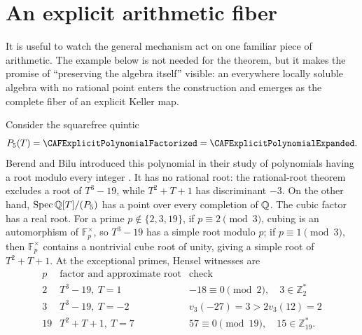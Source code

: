 \section{An explicit arithmetic fiber}\label{sec:example}



It is useful to watch the general mechanism act on one familiar piece of
arithmetic.  The example below is not needed for the theorem, but it makes
the promise of ``preserving the algebra itself'' visible: an everywhere
locally soluble algebra with no rational point enters the construction and
emerges as the complete fiber of an explicit Keller map.

Consider the squarefree quintic
\[
 P_5(T)=\CAFExplicitPolynomialFactorized
 =\CAFExplicitPolynomialExpanded.
\]
Berend and Bilu introduced this polynomial in their study of polynomials
having a root modulo every integer \cite{BerendBilu}.
It has no rational root: the rational-root theorem excludes a root of
\(T^3-19\), while \(T^2+T+1\) has discriminant \(-3\).  On the other hand,
\(\operatorname{Spec}\mathbb Q[T]/(P_5)\) has a point over every completion of \(\mathbb Q\).  The cubic
factor has a real root.  For a prime
\(p\notin\{2,3,19\}\), if \(p\equiv2\pmod3\), cubing is an automorphism of
\(\mathbb F_p^\times\), so \(T^3-19\) has a simple root modulo \(p\); if
\(p\equiv1\pmod3\), then \(\mathbb F_p^\times\) contains a nontrivial cube
root of unity, giving a simple root of \(T^2+T+1\).  At the exceptional
primes, Hensel witnesses are
\[
\begin{array}{c|c|c}
p&\text{factor and approximate root}&\text{check}\\ \hline
2&T^3-19,\ T=1&-18\equiv0\pmod2,\quad 3\in\mathbb Z_2^*\\
3&T^3-19,\ T=-2&v_3(-27)=3>2v_3(12)=2\\
19&T^2+T+1,\ T=7&57\equiv0\pmod{19},\quad15\in\mathbb Z_{19}^*.
\end{array}
\]

